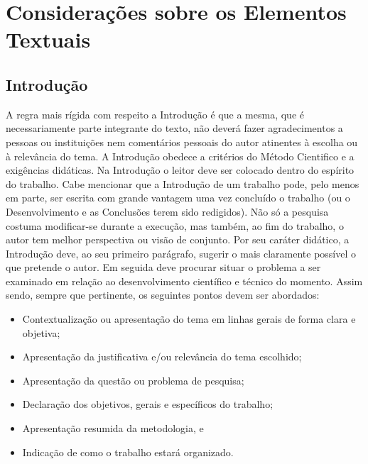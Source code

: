 \chapter[Considerações sobre os Elementos Textuais]{Considerações sobre os
Elementos Textuais}
\section{Introdução}
A regra mais rígida com respeito a Introdução é que a mesma, que é
necessariamente parte integrante do texto, não deverá fazer agradecimentos
a pessoas ou instituições nem comentários pessoais do autor atinentes à
escolha ou à relevância do tema.
A Introdução obedece a critérios do Método Cientifico e a exigências
didáticas. Na Introdução o leitor deve ser colocado dentro do espírito do
trabalho.
Cabe mencionar que a Introdução de um trabalho pode, pelo menos em parte,
ser escrita com grande vantagem uma vez concluído o trabalho (ou o
Desenvolvimento e as Conclusões terem sido redigidos). Não só a pesquisa
costuma modificar-se durante a execução, mas também, ao fim do trabalho, o
autor tem melhor perspectiva ou visão de conjunto.
Por seu caráter didático, a Introdução deve, ao seu primeiro parágrafo,
sugerir o mais claramente possível o que pretende o autor. Em seguida deve
procurar situar o problema a ser examinado em relação ao desenvolvimento
científico e técnico do momento. Assim sendo, sempre que pertinente, os
seguintes pontos devem ser abordados:
\begin{itemize}
\item Contextualização ou apresentação do tema em linhas gerais de
forma clara e objetiva;
\item Apresentação da justificativa e/ou relevância do tema escolhido;
\item Apresentação da questão ou problema de pesquisa;
\item Declaração dos objetivos, gerais e específicos do trabalho;
\item Apresentação resumida da metodologia, e
\item Indicação de como o trabalho estará organizado.
\end{itemize}
